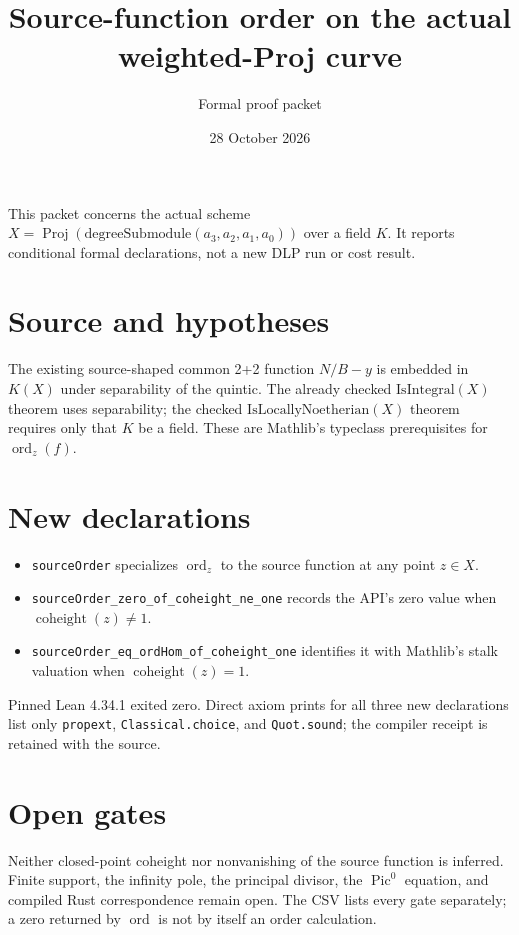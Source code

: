 \documentclass[10pt]{article}
\title{Source-function order on the actual weighted-Proj curve}
\author{Formal proof packet}
\date{28 October 2026}
\begin{document}
\maketitle
\noindent This packet concerns the actual scheme $X=\operatorname{Proj}(\mathrm{degreeSubmodule}(a_3,a_2,a_1,a_0))$ over a field $K$. It reports conditional formal declarations, not a new DLP run or cost result.
\section*{Source and hypotheses}
The existing source-shaped common 2+2 function $N/B-y$ is embedded in $K(X)$ under separability of the quintic. The already checked $\mathrm{IsIntegral}(X)$ theorem uses separability; the checked $\mathrm{IsLocallyNoetherian}(X)$ theorem requires only that $K$ be a field. These are Mathlib's typeclass prerequisites for $\operatorname{ord}_z(f)$.
\section*{New declarations}
\begin{itemize}
\item \texttt{sourceOrder} specializes $\operatorname{ord}_z$ to the source function at any point $z\in X$.
\item \texttt{sourceOrder\_zero\_of\_coheight\_ne\_one} records the API's zero value when $\operatorname{coheight}(z)\ne1$.
\item \texttt{sourceOrder\_eq\_ordHom\_of\_coheight\_one} identifies it with Mathlib's stalk valuation when $\operatorname{coheight}(z)=1$.
\end{itemize}
Pinned Lean 4.34.1 exited zero. Direct axiom prints for all three new declarations list only \texttt{propext}, \texttt{Classical.choice}, and \texttt{Quot.sound}; the compiler receipt is retained with the source.
\section*{Open gates}
Neither closed-point coheight nor nonvanishing of the source function is inferred. Finite support, the infinity pole, the principal divisor, the $\operatorname{Pic}^{0}$ equation, and compiled Rust correspondence remain open. The CSV lists every gate separately; a zero returned by $\operatorname{ord}$ is not by itself an order calculation.
\clearpage
\end{document}
